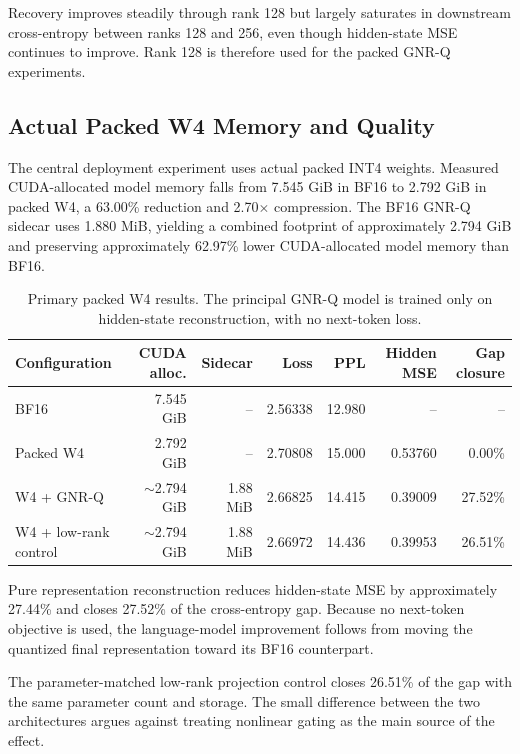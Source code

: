 \documentclass[11pt]{article}
\begin{document}
Recovery improves steadily through rank 128 but largely saturates in downstream cross-entropy between ranks 128 and 256, even though hidden-state MSE continues to improve. Rank 128 is therefore used for the packed GNR-Q experiments.

\subsection{Actual Packed W4 Memory and Quality}

The central deployment experiment uses actual packed INT4 weights. Measured CUDA-allocated model memory falls from 7.545 GiB in BF16 to 2.792 GiB in packed W4, a 63.00\% reduction and 2.70$\times$ compression. The BF16 GNR-Q sidecar uses 1.880 MiB, yielding a combined footprint of approximately 2.794 GiB and preserving approximately 62.97\% lower CUDA-allocated model memory than BF16.

\begin{table}[t]
\centering
\small
\begin{tabular}{lrrrrrr}
\toprule
Configuration & CUDA alloc. & Sidecar & Loss & PPL & Hidden MSE & Gap closure \\
\midrule
BF16 & 7.545 GiB & -- & 2.56338 & 12.980 & -- & -- \\
Packed W4 & 2.792 GiB & -- & 2.70808 & 15.000 & 0.53760 & 0.00\% \\
W4 + GNR-Q & $\sim$2.794 GiB & 1.88 MiB & 2.66825 & 14.415 & 0.39009 & 27.52\% \\
W4 + low-rank control & $\sim$2.794 GiB & 1.88 MiB & 2.66972 & 14.436 & 0.39953 & 26.51\% \\
\bottomrule
\end{tabular}
\caption{Primary packed W4 results. The principal GNR-Q model is trained only on hidden-state reconstruction, with no next-token loss.}
\label{tab:packed}
\end{table}

Pure representation reconstruction reduces hidden-state MSE by approximately 27.44\% and closes 27.52\% of the cross-entropy gap. Because no next-token objective is used, the language-model improvement follows from moving the quantized final representation toward its BF16 counterpart.

The parameter-matched low-rank projection control closes 26.51\% of the gap with the same parameter count and storage. The small difference between the two architectures argues against treating nonlinear gating as the main source of the effect.
\end{document}
